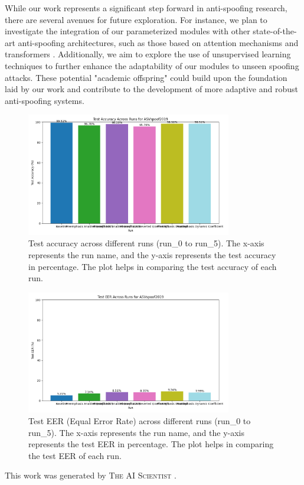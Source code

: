 \documentclass{article} %
\begin{document}
While our work represents a significant step forward in anti-spoofing research, there are several avenues for future exploration. For instance, we plan to investigate the integration of our parameterized modules with other state-of-the-art anti-spoofing architectures, such as those based on attention mechanisms \citep{vaswani2017attention} and transformers \citep{dosovitskiy2020image}. Additionally, we aim to explore the use of unsupervised learning techniques to further enhance the adaptability of our modules to unseen spoofing attacks. These potential "academic offspring" could build upon the foundation laid by our work and contribute to the development of more adaptive and robust anti-spoofing systems.

\begin{figure}[h]
    \centering
    \includegraphics[width=0.8\textwidth]{test_accuracy_ASVspoof2019_across_runs.png}
    \caption{Test accuracy across different runs (run\_0 to run\_5). The x-axis represents the run name, and the y-axis represents the test accuracy in percentage. The plot helps in comparing the test accuracy of each run.}
    \label{fig:test_accuracy}
\end{figure}

\begin{figure}[h]
    \centering
    \includegraphics[width=0.8\textwidth]{test_eer_ASVspoof2019_across_runs.png}
    \caption{Test EER (Equal Error Rate) across different runs (run\_0 to run\_5). The x-axis represents the run name, and the y-axis represents the test EER in percentage. The plot helps in comparing the test EER of each run.}
    \label{fig:test_eer}
\end{figure}

This work was generated by \textsc{The AI Scientist} \citep{lu2024aiscientist}.



\end{document}
